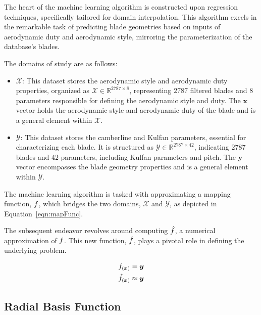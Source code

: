 \documentclass[11pt,a4paper,twocolumn]{article}
\begin{document}

The heart of the machine learning algorithm is constructed upon regression techniques, specifically tailored for domain interpolation. This algorithm excels in the remarkable task of predicting blade geometries based on inputs of aerodynamic duty and aerodynamic style, mirroring the parameterization of the database's blades.

The domains of study are as follows:
\begin{itemize}
    \item $\mathcal{X}$: This dataset stores the aerodynamic style and aerodynamic duty properties, organized as $\mathcal{X} \in \mathbb{R}^{2787 \times 8}$, representing $2787$ filtered blades and $8$ parameters responsible for defining the aerodynamic style and duty. The $\boldsymbol{x}$ vector holds the aerodynamic style and aerodynamic duty of the blade and is a general element within $\mathcal{X}$.
    \item $\mathcal{Y}$: This dataset stores the camberline and Kulfan parameters, essential for characterizing each blade. It is structured as $\mathcal{Y} \in \mathbb{R}^{2787 \times 42}$, indicating $2787$ blades and $42$ parameters, including Kulfan parameters and pitch. The $\boldsymbol{y}$ vector encompasses the blade geometry properties and is a general element within $\mathcal{Y}$.
\end{itemize}

The machine learning algorithm is tasked with approximating a mapping function, $\mathnormal{f}$, which bridges the two domains, $\mathcal{X}$ and $\mathcal{Y}$, as depicted in Equation~\ref{eqn:mapFunc}.

The subsequent endeavor revolves around computing $\hat{\mathnormal{f}}$, a numerical approximation of $\mathnormal{f}$. This new function, $\hat{\mathnormal{f}}$, plays a pivotal role in defining the underlying problem.

\begin{align}
    \mathnormal{f}_{(\boldsymbol{x})} = \boldsymbol{y}
    \label{eqn:mapFunc} \\
    \hat{\mathnormal{f}}_{(\boldsymbol{x})} \approx \boldsymbol{y}
    \label{eqn:mapFuncML}
\end{align}

\subsection{Radial Basis Function}
\end{document}
